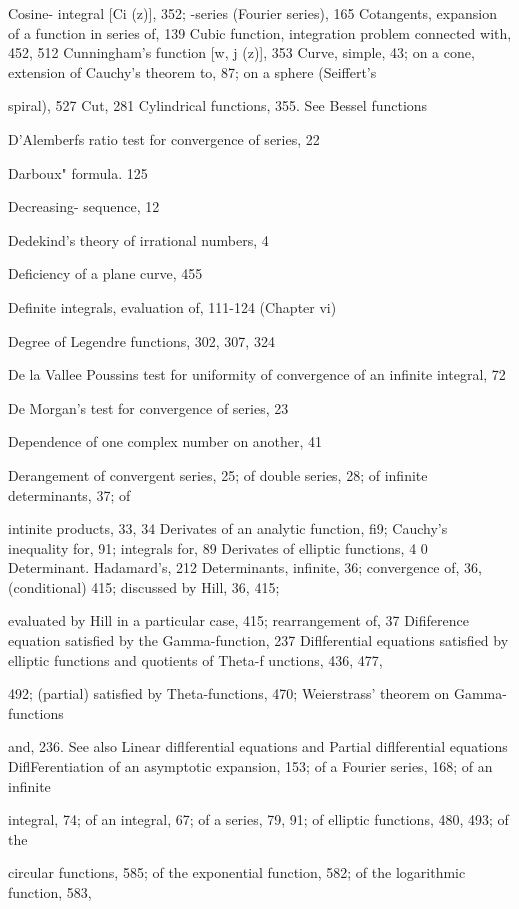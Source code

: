 Cosine- integral [Ci (z)], 352; -series (Fourier series), 165
Cotangents, expansion of a function in series of, 139
Cubic function, integration problem connected with, 452, 512
Cunningham's function [w,  j (z)], 353
Curve, simple, 43; on a cone, extension of Cauchy's theorem to, 87; on a sphere (Seiffert's

spiral), 527
Cut, 281
Cylindrical functions, 355. See Bessel functions

%
%
D'Alemberfs ratio test for convergence of series, 22

Darboux" formula. 125

Decreasing- sequence, 12

Dedekind's theory of irrational numbers, 4

Deficiency of a plane curve, 455

Definite integrals, evaluation of, 111-124 (Chapter vi)

Degree of Legendre functions, 302, 307, 324

De la Vallee Poussins test for uniformity of convergence of an infinite integral, 72

De Morgan's test for convergence of series, 23

Dependence of one complex number on another, 41

Derangement of convergent series, 25; of double series, 28; of infinite determinants, 37; of

intinite products, 33, 34
Derivates of an analytic function, fi9; Cauchy's inequality for, 91; integrals for, 89
Derivates of elliptic functions, 4 0
Determinant. Hadamard's, 212
Determinants, infinite, 36; convergence of, 36, (conditional) 415; discussed by Hill, 36, 415;

evaluated by Hill in a particular case, 415; rearrangement of, 37
Difiference equation satisfied by the Gamma-function, 237
Diflferential equations satisfied by elliptic functions and quotients of Theta-f unctions, 436, 477,

492; (partial) satisfied by Theta-functions, 470; Weierstrass' theorem on Gamma-functions

and, 236. See also Linear diflferential equations and Partial diflferential equations
DiflFerentiation of an asymptotic expansion, 153; of a Fourier series, 168; of an infinite

integral, 74; of an integral, 67; of a series, 79, 91; of elliptic functions, 480, 493; of the

circular functions, 585; of the exponential function, 582; of the logarithmic function, 583,

